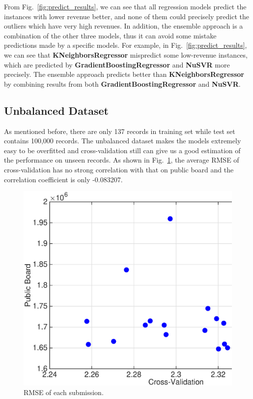 \documentclass[10pt, oneside]{article}   	%
\newcommand\figref{Fig.~\ref}
\begin{document}
From \figref{fig:predict_results}, we can see that all regression models predict the instances with lower revenue better, and none of them could precisely predict the outliers which have very high revenues. 
In addition, the ensemble approach is a combination of the other three models, thus it can avoid some mistake predictions made by a specific models.
For example, in \figref{fig:predict_results}, we can see that \textbf{KNeighborsRegressor} mispredict some low-revenue instances, which are predicted by \textbf{GradientBoostingRegressor} and \textbf{NuSVR} more precisely. 
The ensemble approach predicts better than  \textbf{KNeighborsRegressor} by combining results from both \textbf{GradientBoostingRegressor} and \textbf{NuSVR}.

 
\subsection{Unbalanced Dataset}
As mentioned before, there are only 137 records in training set while test set contains 100,000 records.
The unbalanced dataset makes the models extremely easy to be overfitted and cross-validation still can give us a good estimation of the performance on unseen records.
As shown in \figref{fig:cv_lb_error}, the average RMSE of cross-validation has no strong correlation with that on public board and the correlation coefficient is only -0.083207.

\begin{figure}[h]
   \centering
   \includegraphics[width=4.8in]{figs/cv_pb_scores.eps} 
   \caption{RMSE of each submission.}
   \label{fig:cv_lb_error}
\end{figure}
\end{document}
